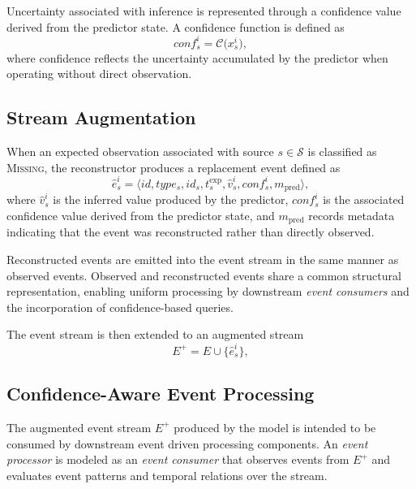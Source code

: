Uncertainty associated with inference is represented through a confidence value derived from the predictor state. A confidence function is defined as
\begin{equation}
conf_s^{i} = \mathcal{C}\bigl(x_s^{i}\bigr),
\end{equation}
\noindent
where confidence reflects the uncertainty accumulated by the predictor when operating without direct observation.

\subsection{Stream Augmentation}
\label{sec:confidence-stream-augmentation}

When an expected observation associated with source $s \in \mathcal{S}$ is classified as \textsc{Missing}, the reconstructor produces a replacement event defined as
\begin{equation}
\hat{e}_s^{i} =
\langle id, type_s, id_s, t^{\mathrm{exp}}_s, \hat{v}_s^{i}, conf_s^{i}, m_{\mathrm{pred}} \rangle ,
\end{equation}
\noindent
where $\hat{v}_s^{i}$ is the inferred value produced by the predictor, $conf_s^{i}$ is the associated confidence value derived from the predictor state, and $m_{\mathrm{pred}}$ records metadata indicating that the event was reconstructed rather than directly observed.

Reconstructed events are emitted into the event stream in the same manner as observed events. Observed and reconstructed events share a common structural representation, enabling uniform processing by downstream \emph{event consumers} and the incorporation of confidence-based queries.

The event stream is then extended to an augmented stream
\begin{equation}
E^{+} = E \cup \{ \hat{e}_s^{i} \},
\end{equation}




\subsection{Confidence-Aware Event Processing}
\label{sec:confidence-aware-semantics}

The augmented event stream $E^{+}$ produced by the model is intended to be consumed by downstream event driven processing components. An \emph{event processor} is modeled as an \emph{event consumer} that observes events from $E^{+}$ and evaluates event patterns and temporal relations over the stream.

